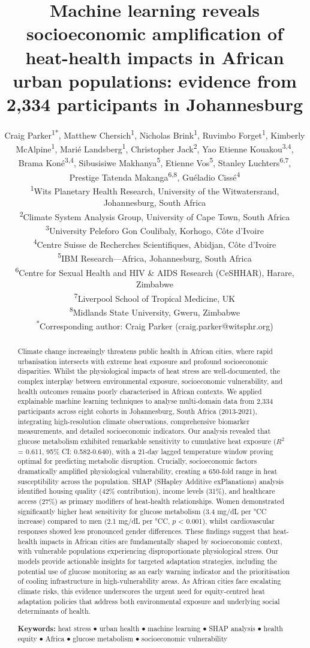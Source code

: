\documentclass[11pt,a4paper]{article}
\title{Machine learning reveals socioeconomic amplification of heat-health impacts in African urban populations: evidence from 2,334 participants in Johannesburg}
\author{
Craig Parker\textsuperscript{1*}, 
Matthew Chersich\textsuperscript{1}, 
Nicholas Brink\textsuperscript{1}, 
Ruvimbo Forget\textsuperscript{1}, 
Kimberly McAlpine\textsuperscript{1}, 
Mari\'{e} Landsberg\textsuperscript{1}, 
Christopher Jack\textsuperscript{2}, 
Yao Etienne Kouakou\textsuperscript{3,4}, 
Brama Kon\'{e}\textsuperscript{3,4}, 
Sibusisiwe Makhanya\textsuperscript{5}, 
Etienne Vos\textsuperscript{5}, 
Stanley Luchters\textsuperscript{6,7}, 
Prestige Tatenda Makanga\textsuperscript{6,8}, 
Gu\'{e}ladio Ciss\'{e}\textsuperscript{4}\\[1em]
\small
\textsuperscript{1}Wits Planetary Health Research, University of the Witwatersrand, Johannesburg, South Africa\\
\textsuperscript{2}Climate System Analysis Group, University of Cape Town, South Africa\\
\textsuperscript{3}University Peleforo Gon Coulibaly, Korhogo, C\^{o}te d'Ivoire\\
\textsuperscript{4}Centre Suisse de Recherches Scientifiques, Abidjan, C\^{o}te d'Ivoire\\
\textsuperscript{5}IBM Research---Africa, Johannesburg, South Africa\\
\textsuperscript{6}Centre for Sexual Health and HIV \& AIDS Research (CeSHHAR), Harare, Zimbabwe\\
\textsuperscript{7}Liverpool School of Tropical Medicine, UK\\
\textsuperscript{8}Midlands State University, Gweru, Zimbabwe\\[0.5em]
\textsuperscript{*}Corresponding author: Craig Parker (craig.parker@witsphr.org)
}
\date{}
\newcommand{\degrees}{°C}
\begin{document}
\maketitle

\begin{abstract}
\noindent Climate change increasingly threatens public health in African cities, where rapid urbanisation intersects with extreme heat exposure and profound socioeconomic disparities. Whilst the physiological impacts of heat stress are well-documented, the complex interplay between environmental exposure, socioeconomic vulnerability, and health outcomes remains poorly characterised in African contexts. We applied explainable machine learning techniques to analyse multi-domain data from 2,334 participants across eight cohorts in Johannesburg, South Africa (2013-2021), integrating high-resolution climate observations, comprehensive biomarker measurements, and detailed socioeconomic indicators. Our analysis revealed that glucose metabolism exhibited remarkable sensitivity to cumulative heat exposure ($R^2$ = 0.611, 95\% CI: 0.582-0.640), with a 21-day lagged temperature window proving optimal for predicting metabolic disruption. Crucially, socioeconomic factors dramatically amplified physiological vulnerability, creating a 650-fold range in heat susceptibility across the population. SHAP (SHapley Additive exPlanations) analysis identified housing quality (42\% contribution), income levels (31\%), and healthcare access (27\%) as primary modifiers of heat-health relationships. Women demonstrated significantly higher heat sensitivity for glucose metabolism (3.4 mg/dL per \degrees C increase) compared to men (2.1 mg/dL per \degrees C, $p$ < 0.001), whilst cardiovascular responses showed less pronounced gender differences. These findings suggest that heat-health impacts in African cities are fundamentally shaped by socioeconomic context, with vulnerable populations experiencing disproportionate physiological stress. Our models provide actionable insights for targeted adaptation strategies, including the potential use of glucose monitoring as an early warning indicator and the prioritisation of cooling infrastructure in high-vulnerability areas. As African cities face escalating climate risks, this evidence underscores the urgent need for equity-centred heat adaptation policies that address both environmental exposure and underlying social determinants of health.

\vspace{0.5em}
\noindent \textbf{Keywords:} heat stress $\bullet$ urban health $\bullet$ machine learning $\bullet$ SHAP analysis $\bullet$ health equity $\bullet$ Africa $\bullet$ glucose metabolism $\bullet$ socioeconomic vulnerability
\end{abstract}
\end{document}
